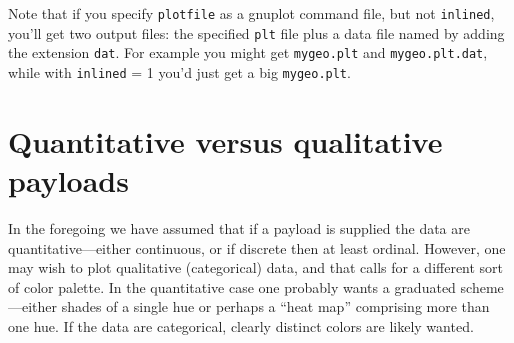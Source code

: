 \documentclass{article}
\begin{document}
Note that if you specify \texttt{plotfile} as a \textsf{gnuplot}
command file, but not \texttt{inlined}, you'll get two output files:
the specified \texttt{plt} file plus a data file named by adding the
extension \texttt{dat}. For example you might get \texttt{mygeo.plt}
and \texttt{mygeo.plt.dat}, while with \texttt{inlined} = 1 you'd just
get a big \texttt{mygeo.plt}.

\section{Quantitative versus qualitative payloads}
\label{sec:qualitative}

In the foregoing we have assumed that if a payload is supplied the
data are quantitative---either continuous, or if discrete then at
least ordinal. However, one may wish to plot qualitative (categorical)
data, and that calls for a different sort of color palette.  In the
quantitative case one probably wants a graduated scheme---either
shades of a single hue or perhaps a ``heat map'' comprising more than
one hue. If the data are categorical, clearly distinct colors are
likely wanted.
\end{document}
